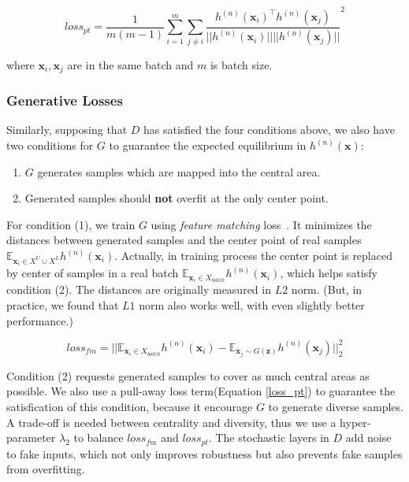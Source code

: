     \begin{equation}\label{loss_pt}
    loss_{pt} = \frac{1}{m(m-1)}\sum\limits_{i=1}^m\sum\limits_{j\neq i}\frac{h^{(n)}(\mathbf{x}_i)^\top h^{(n)}(\mathbf{x}_j)}{||h^{(n)}(\mathbf{x}_i)||||h^{(n)}(\mathbf{x}_j)||}^2
\end{equation}

\noindent where $\mathbf{x}_i,\mathbf{x}_j$ are in the same batch and $m$ is batch size.

\subsubsection{Generative Losses} Similarly, supposing that $D$ has satisfied the four conditions above, we also have two conditions for $G$ to guarantee the expected equilibrium in $h^{(n)}(\mathbf{x})$:

\begin{enumerate}
\item $G$ generates samples which are mapped into the central area.
\item Generated samples should \textbf{not} overfit at the only center point.
\end{enumerate}

For condition (1), we train $G$ using \emph{feature matching} loss~\cite{salimans2016improved}. It minimizes the distances between generated samples and the center point of real samples $\mathbb{E}_{\mathbf{x}_i \in X^U\cup X^L} h^{(n)}(\mathbf{x}_i)$. Actually, in training process the center point is replaced by center of samples in a real batch $\mathbb{E}_{\mathbf{x}_i \in X_{batch}} h^{(n)}(\mathbf{x}_i)$, which helps satisfy condition (2).
The distances are originally measured in $L2$ norm. (But, in practice, we found that $L1$ norm also works well, with even slightly better performance.)

\begin{equation}
	loss_{fm} = ||\mathbb{E}_{\mathbf{x}_i \in X_{batch}} h^{(n)}(\mathbf{x}_i) - \mathbb{E}_{\mathbf{x}_j \sim G(\mathbf{z})} h^{(n)}(\mathbf{x}_j)||_2^2
\end{equation}

Condition (2) requests generated samples to cover as much central areas as possible. We also use a pull-away loss term(Equation \ref{loss_pt}) to guarantee the satisfication of this condition, because it encourage $G$ to generate diverse samples. A trade-off is needed between centrality and diversity, thus we use a hyper-parameter $\lambda_2$ to balance $loss_{fm}$ and $loss_{pt}$. The stochastic layers in $D$ add noise to fake inputs, which not only improves robustness but also prevents fake samples from overfitting.


